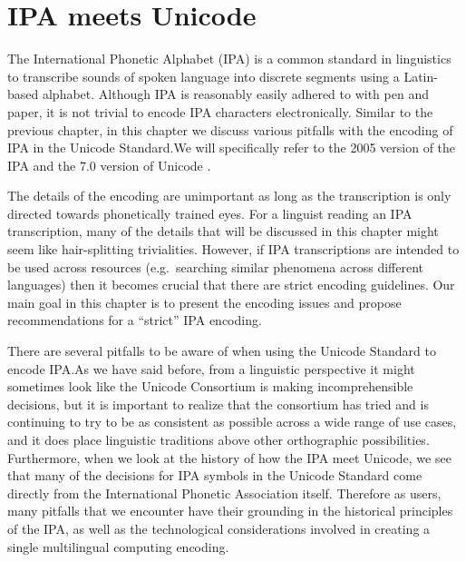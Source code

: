 \chapter{IPA meets Unicode}
\label{ipa-meets-unicode}

The International Phonetic Alphabet (IPA) is a common standard in linguistics to
transcribe sounds of spoken language into discrete segments using a Latin-based 
alphabet. Although IPA is reasonably easily adhered to with pen and paper, it is not trivial to encode
IPA characters electronically. Similar to the previous chapter, in this chapter
we discuss various pitfalls with the encoding of IPA in the Unicode Standard.\@ We will
specifically refer to the 2005 version of the IPA \citep{IPA2005} and the 7.0 
version of Unicode \citep{Unicode2014}.

The details of the encoding are unimportant as long as the
transcription is only directed towards phonetically trained eyes. For a linguist
reading an IPA transcription, many of the details that will be discussed in this
chapter might seem like hair-splitting trivialities. However, if IPA
transcriptions are intended to be used across resources (e.g.~searching similar
phenomena across different languages) then it becomes crucial that there are strict
encoding guidelines. Our main goal in this chapter is to present the encoding
issues and propose recommendations for a ``strict'' IPA encoding.

There are several pitfalls to be aware of when using the Unicode Standard to
encode IPA.\@ As we have said before, from a linguistic perspective it might
sometimes look like the Unicode Consortium is making incomprehensible decisions,
but it is important to realize that the consortium has tried and is continuing
to try to be as consistent as possible across a wide range of use cases, and it
does place linguistic traditions above other orthographic possibilities. Furthermore, 
when we look at the history of how the IPA meet Unicode, we see that many of the 
decisions for IPA symbols in the Unicode Standard come directly from the 
International Phonetic Association itself. Therefore as users, many pitfalls that we 
encounter have their grounding in the historical principles of the IPA, as 
well as the technological considerations involved in creating a single 
multilingual computing encoding.


